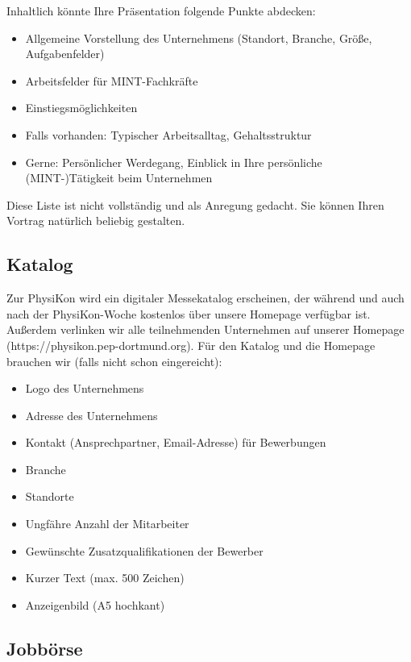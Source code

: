 \documentclass[
  paper=a4,
  fontsize=12pt,
  DIV=16,
  headheight=30pt,
  footheight=45pt,
  headinclude,
  parskip=half,
]{scrartcl}
\begin{document}
Inhaltlich könnte Ihre Präsentation folgende Punkte abdecken:
\begin{itemize}
    \item Allgemeine Vorstellung des Unternehmens (Standort, Branche, Größe, Aufgabenfelder)
    \item Arbeitsfelder für MINT-Fachkräfte
    \item Einstiegsmöglichkeiten
    \item Falls vorhanden: Typischer Arbeitsalltag, Gehaltsstruktur
    \item Gerne: Persönlicher Werdegang, Einblick in Ihre persönliche (MINT-)Tätigkeit beim Unternehmen
\end{itemize} 

Diese Liste ist nicht vollständig und als Anregung gedacht.
Sie können Ihren Vortrag natürlich beliebig gestalten.

\subsection*{Katalog}

Zur PhysiKon wird ein digitaler Messekatalog erscheinen, der während und auch nach der PhysiKon-Woche kostenlos über unsere Homepage verfügbar ist.
Außerdem verlinken wir alle teilnehmenden Unternehmen auf unserer Homepage (https://physikon.pep-dortmund.org).
Für den Katalog und die Homepage brauchen wir (falls nicht schon eingereicht):
\begin{itemize}
    \item Logo des Unternehmens
    \item Adresse des Unternehmens
    \item Kontakt (Ansprechpartner, Email-Adresse) für Bewerbungen
    \item Branche
    \item Standorte
    \item Ungfähre Anzahl der Mitarbeiter
    \item Gewünschte Zusatzqualifikationen der Bewerber
    \item Kurzer Text (max. 500 Zeichen)
    \item Anzeigenbild (A5 hochkant)
\end{itemize}




\subsection*{Jobbörse}
\end{document}
